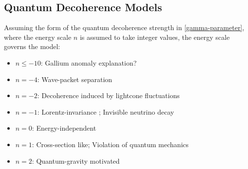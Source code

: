 \subsection{Quantum Decoherence Models}
Assuming the form of the quantum decoherence strength in \cref{gamma-parameter}, where the energy scale $n$ is assumed to take integer values, the energy scale governs the model:
\begin{itemize}
    \item $n\leq-10$: Gallium anomaly explanation? \cite{Farzan:2023fqa}
    \item $n=-4$: Wave-packet separation \cite{DUNE:2020ypp,deGouvea:2021uvg}
    \item $n = - 2$: Decoherence induced by lightcone fluctuations \cite{Stuttard:2021uyw}
    \item $n = - 1$: Lorentz-invariance \cite{Lisi:2000zt}; Invisible neutrino decay \cite{Lindner:2001fx,Berryman:2014yoa}
    \item $n = 0$: Energy-independent 
    \item $n = 1$: Cross-section like; Violation of quantum mechanics \cite{Liu:1997km}
    \item $n = 2$: Quantum-gravity motivated \cite{QD_Stutt_Jens_2020}
\end{itemize}

